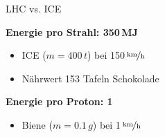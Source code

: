 \begin{frame}{LHC vs. ICE}
\begin{spacing}{2}
       \textbf{ Energie pro Strahl: 350\,MJ } \\
   \begin{itemize}
       \item[\ding{43}] ICE ($m=400\,t$) bei 150\,$\nicefrac{\text{km}}{\text{h}}$ \\ 
       \item[\ding{43}] Nährwert 153 Tafeln Schokolade\\ 
   \end{itemize}

     \textbf{Energie pro Proton: 1\, } \\
   \begin{itemize}
       \item[\ding{43}] Biene ($m=0.1\,g$) bei 1\,$\nicefrac{\text{km}}{\text{h}}$ 
   \end{itemize}
   
\end{spacing}

   
    
\end{frame}

